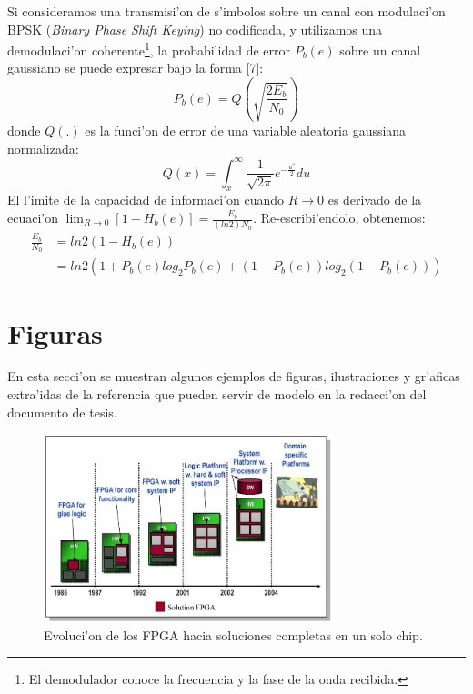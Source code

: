 Si consideramos una transmisi'on de s'imbolos sobre un canal con modulaci'on BPSK (\emph{Binary Phase Shift Keying}) no codificada, y utilizamos una demodulaci'on coherente\footnote{El demodulador conoce la frecuencia y la fase de la onda recibida.\label{footnote}}, la probabilidad de error \begin{math}P_b(e)\end{math} sobre un canal gaussiano se puede expresar bajo la forma [7]:
\[P_b(e)=Q\left(\sqrt{\frac{2E_b}{N_0}}\right)\]
donde \begin{math}Q(.)\end{math} es la funci'on de error de una variable aleatoria gaussiana normalizada:
\[Q(x)=\int_x^\infty \frac{1}{\sqrt{2\pi}}e^{-\frac{u^2}{2}}du\]
El l'imite de la capacidad de informaci'on cuando \begin{math}R \to 0\end{math} es derivado de la ecuaci'on \begin{math}\lim_{R \to 0} [1-H_b(e)]=\frac{E_b}{(ln 2) N_0}\end{math}. Re-escribi'endolo, obtenemos:
\[
\begin{aligned}
\frac{E_b}{N_0}&=ln 2(1-H_b(e))\\
&=ln 2(1+P_b(e)log_2P_b(e)+(1-P_b(e))log_2(1-P_b(e)))
\end{aligned}
\]

\section{Figuras}
\noindent
En esta secci'on se muestran algunos ejemplos de figuras, ilustraciones y gr'aficas extra'idas de la referencia \cite{Demo:phdTesis} que pueden servir de modelo en la redacci'on del documento de tesis.
\begin{figure}[H]
\centering
\includegraphics[width=0.75\textwidth]{images/figura4_1}
\caption{Evoluci'on de los FPGA hacia soluciones completas en un solo chip.}
\label{fig:4.1}
\end{figure}

